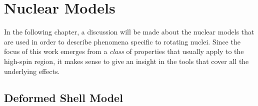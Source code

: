


\section{Nuclear Models}
\label{section-nuclear-models}

In the following chapter, a discussion will be made about the nuclear models that are used in order to describe phenomena specific to rotating nuclei. Since the focus of this work emerges from a \emph{class} of properties that usually apply to the high-spin region, it makes sense to give an insight in the tools that cover all the underlying effects.

\subsection{Deformed Shell Model}

